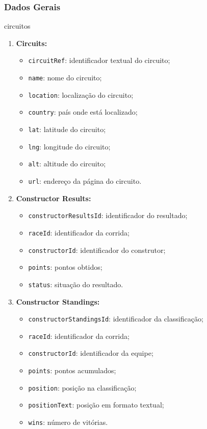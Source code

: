 \documentclass[12pt]{article}
\begin{document}
\subsubsection{Dados Gerais}circuitos
\begin{enumerate} 
    \item \textbf{Circuits:}
    \begin{itemize} 
        \item \texttt{circuitRef}: identificador textual do circuito; \item \texttt{name}: nome do circuito; 
        \item \texttt{location}: localização do circuito; 
        \item \texttt{country}: país onde está localizado; 
        \item \texttt{lat}: latitude do circuito; 
        \item \texttt{lng}: longitude do circuito; 
        \item \texttt{alt}: altitude do circuito; 
        \item \texttt{url}: endereço da página do circuito. 
    \end{itemize}
    \item \textbf{Constructor Results:}
    \begin{itemize}
        \item \texttt{constructorResultsId}: identificador do resultado;
        \item \texttt{raceId}: identificador da corrida;
        \item \texttt{constructorId}: identificador do construtor;
        \item \texttt{points}: pontos obtidos;
        \item \texttt{status}: situação do resultado.
    \end{itemize}
    
        \item \textbf{Constructor Standings:}
    \begin{itemize}
        \item \texttt{constructorStandingsId}: identificador da classificação;
        \item \texttt{raceId}: identificador da corrida;
        \item \texttt{constructorId}: identificador da equipe;
        \item \texttt{points}: pontos acumulados;
        \item \texttt{position}: posição na classificação;
        \item \texttt{positionText}: posição em formato textual;
        \item \texttt{wins}: número de vitórias.
    \end{itemize}


\end{enumerate}
\end{document}
